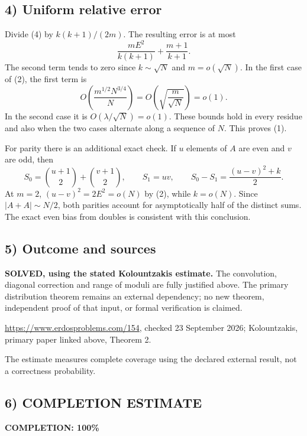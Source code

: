 \subsection*{4) Uniform relative error}
Divide (4) by $k(k+1)/(2m)$. The resulting error is at most
\[
 \frac{mE^2}{k(k+1)}+\frac{m+1}{k+1}.\tag{5}
\]
The second term tends to zero since $k\sim\sqrt N$ and $m=o(\sqrt N)$. In the first case of (2), the first term is
\[
 O\!\left(\frac{m^{1/2}N^{3/4}}{N}\right)
 =O\!\left(\sqrt{\frac{m}{\sqrt N}}\right)=o(1).
\]
In the second case it is $O(\lambda/\sqrt N)=o(1)$. These bounds hold in every residue and also when the two cases alternate along a sequence of $N$. This proves (1).

For parity there is an additional exact check. If $u$ elements of $A$ are even and $v$ are odd, then
\[
 S_0=\binom{u+1}{2}+\binom{v+1}{2},\qquad S_1=uv,
 \qquad S_0-S_1=\frac{(u-v)^2+k}{2}.
\]
At $m=2$, $(u-v)^2=2E^2=o(N)$ by (2), while $k=o(N)$. Since $|A+A|\sim N/2$, both parities account for asymptotically half of the distinct sums. The exact even bias from doubles is consistent with this conclusion.

\subsection*{5) Outcome and sources}
\textbf{SOLVED, using the stated Kolountzakis estimate.} The convolution, diagonal correction and range of moduli are fully justified above. The primary distribution theorem remains an external dependency; no new theorem, independent proof of that input, or formal verification is claimed.

\url{https://www.erdosproblems.com/154}, checked 23 September 2026; Kolountzakis, primary paper linked above, Theorem 2.

The estimate measures complete coverage using the declared external result, not a correctness probability.
\subsection*{6) COMPLETION ESTIMATE}
\textbf{COMPLETION: 100\%}
